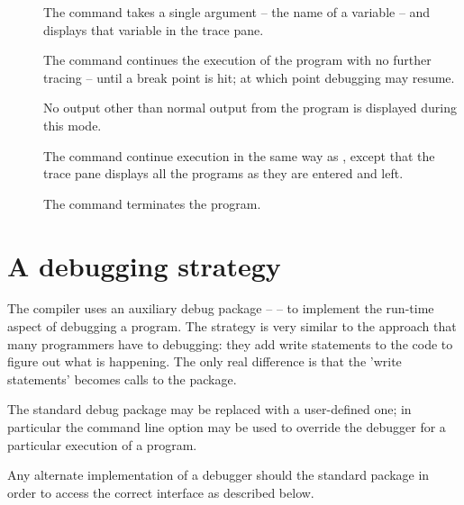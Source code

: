 \begin{description}
\item[]
The  command takes a single argument -- the name of a variable -- and displays that variable in the trace pane.

\item[]
The  command continues the execution of the program with no further tracing -- until a break point is hit; at which point debugging may resume.

No output other than normal output from the program is displayed during this mode.

\item[]
The  command continue execution in the same way as , except that the trace pane displays all the programs as they are entered and left.

\item[]
The  command terminates the \go program.
\end{description}



\section{A debugging strategy}
\label{debug:strategy}
The \go compiler uses an auxiliary debug package --  -- to implement the run-time aspect of debugging a program. The strategy is very similar to the approach that many programmers have to debugging: they add write statements to the code to figure out what is happening. The only real difference is that the 'write statements' becomes calls to the  package.

The standard debug package may be replaced with a user-defined one; in particular the  command line option may be used to override the debugger for a particular execution of a \go program.
\begin{aside}
Any alternate implementation of a debugger should  the standard  package in order to access the  correct  interface as described below.
\end{aside}

